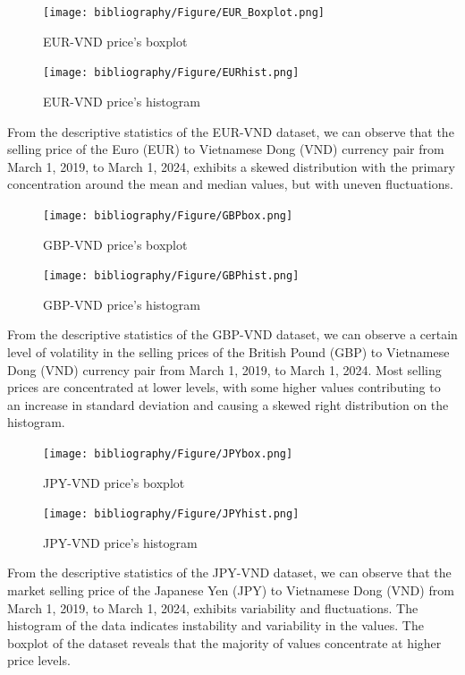 \documentclass{ieeeojies}
\begin{document}
\begin{figure}[H]
    \centering
    \begin{minipage}{0.23\textwidth}
    \centering
    \texttt{[image: bibliography/Figure/EUR\_Boxplot.png]}
    \caption{EUR-VND price's boxplot}
    \label{fig:1}
    \end{minipage}
    \hfill
    \begin{minipage}{0.23\textwidth}
    \centering
    \texttt{[image: bibliography/Figure/EURhist.png]}
    \caption{EUR-VND price's histogram}
    \label{fig:2}
    \end{minipage}
\end{figure}
From the descriptive statistics of the EUR-VND dataset, we can observe that the selling price of the Euro (EUR) to Vietnamese Dong (VND) currency pair from March 1, 2019, to March 1, 2024, exhibits a skewed distribution with the primary concentration around the mean and median values, but with uneven fluctuations.
\begin{figure}[H]
    \centering
    \begin{minipage}{0.23\textwidth}
    \centering
    \texttt{[image: bibliography/Figure/GBPbox.png]}
    \caption{GBP-VND price's boxplot}
    \label{fig:1}
    \end{minipage}
    \hfill
    \begin{minipage}{0.23\textwidth}
    \centering
    \texttt{[image: bibliography/Figure/GBPhist.png]}
    \caption{GBP-VND price's histogram}
    \label{fig:2}
    \end{minipage}
\end{figure}
From the descriptive statistics of the GBP-VND dataset, we can observe a certain level of volatility in the selling prices of the British Pound (GBP) to Vietnamese Dong (VND) currency pair from March 1, 2019, to March 1, 2024. Most selling prices are concentrated at lower levels, with some higher values contributing to an increase in standard deviation and causing a skewed right distribution on the histogram. 
\begin{figure}[H]
    \centering
    \begin{minipage}{0.23\textwidth}
    \centering
    \texttt{[image: bibliography/Figure/JPYbox.png]}
    \caption{JPY-VND price's boxplot}
    \label{fig:1}
    \end{minipage}
    \hfill
    \begin{minipage}{0.23\textwidth}
    \centering
    \texttt{[image: bibliography/Figure/JPYhist.png]}
    \caption{JPY-VND price's histogram}
    \label{fig:2}
    \end{minipage}
\end{figure}
From the descriptive statistics of the JPY-VND dataset, we can observe that the market selling price of the Japanese Yen (JPY) to Vietnamese Dong (VND) from March 1, 2019, to March 1, 2024, exhibits variability and fluctuations. The histogram of the data indicates instability and variability in the values. The boxplot of the dataset reveals that the majority of values concentrate at higher price levels.
\end{document}
